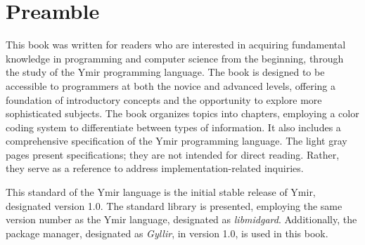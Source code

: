 \chapter*{Preamble}

This book was written for readers who are interested in acquiring fundamental
knowledge in programming and computer science from the beginning, through the
study of the Ymir programming language. The book is designed to be accessible to
programmers at both the novice and advanced levels, offering a foundation of
introductory concepts and the opportunity to explore more sophisticated
subjects. The book organizes topics into chapters, employing a color coding
system to differentiate between types of information. It also includes a
comprehensive specification of the Ymir programming language. The light gray
pages present specifications; they are not intended for direct reading. Rather,
they serve as a reference to address implementation-related inquiries.

This standard of the Ymir language is the initial stable release of Ymir,
designated version 1.0. The standard library is presented, employing the same
version number as the Ymir language, designated as \textit{libmidgard}.
Additionally, the package manager, designated as \textit{Gyllir}, in version
1.0, is used in this book.
